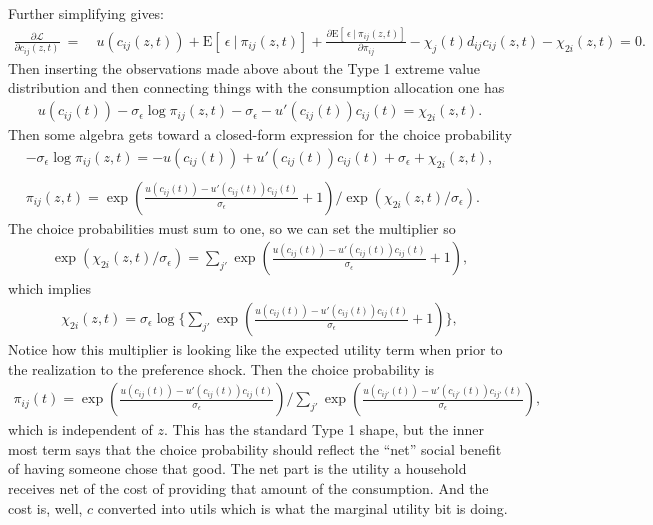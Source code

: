 \documentclass[12pt,pdftex]{article}
\begin{document}
\begin{onehalfspacing}
Further simplifying gives:
\begin{align}
\frac{\partial \mathcal{L} }{\partial c_{ij}(z, t)} \ = \ &  u(c_{ij}(z, t) ) + \mathrm{E}[ \ \epsilon \ | \ \pi_{ij}(z,t) ] + \frac{\partial \mathrm{E}[ \ \epsilon \ | \ \pi_{ij}(z,t) ]}{\partial \pi_{ij}}  - \chi_{j}(t) d_{ij} c_{ij}(z, t)  - \chi_{2i}(z,t)  = 0.
\end{align}
Then inserting the observations made above about the Type 1 extreme value distribution and then connecting things with the consumption allocation one has
\begin{align}
u(c_{ij}(t) ) -\sigma_{\epsilon} \log \pi_{ij}(z,t) - \sigma_{\epsilon} - u'(c_{ij}(t) )c_{ij}(t)   = \chi_{2i}(z,t).
\end{align}
Then some algebra gets toward a closed-form expression for the choice probability
\begin{align}
-\sigma_{\epsilon} \log \pi_{ij}(z,t) = -u(c_{ij}(t)  ) + u'(c_{ij}(t) )c_{ij}(t)  + \sigma_{\epsilon} + \chi_{2i}(z,t), \\
\nonumber \\
\pi_{ij}(z,t) = \exp \left( \frac{u(c_{ij}(t)  ) - u'(c_{ij}(t))c_{ij}(t)}{\sigma_{\epsilon}} + 1 \right) \bigg / \exp \left( \chi_{2i}(z,t) / \sigma_{\epsilon} \right).
\end{align}
The choice probabilities must sum to one, so we can set the multiplier so
\begin{align}
\exp \left( \chi_{2i}(z,t) / \sigma_{\epsilon} \right) = \sum_{j'}\exp \left( \frac{u(c_{ij}(t)) - u'(c_{ij}(t))c_{ij}(t)}{\sigma_{\epsilon}} + 1 \right),
\end{align}
which implies
\begin{align}
\chi_{2i}(z,t) = \sigma_{\epsilon}  \log \bigg \{ \sum_{j'}\exp \left( \frac{u(c_{ij}(t)) - u'(c_{ij}(t))c_{ij}(t)}{\sigma_{\epsilon}} + 1 \right) \bigg \},
\end{align}
Notice how this multiplier is looking like the expected utility term when prior to the realization to the preference shock. Then the choice probability is
\begin{align}
\pi_{ij}(t) =\exp \left( \frac{u(c_{ij}(t)) - u'(c_{ij}(t))c_{ij}(t)}{\sigma_{\epsilon}}\right) \bigg / \sum_{j'}\exp \left( \frac{u(c_{ij'}(t)) - u'(c_{ij'}(t))c_{ij'}(t)}{\sigma_{\epsilon}} \right),
\end{align}
which is independent of $z$. This has the standard Type 1 shape, but the inner most term says that the choice probability should reflect the ``net'' social benefit of having someone chose that good. The net part is the utility a household receives net of the cost of providing that amount of the consumption. And the cost is, well, $c$ converted into utils which is what the marginal utility bit is doing.


\end{onehalfspacing}
\end{document}
